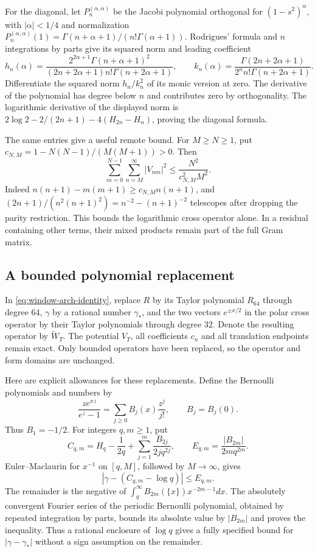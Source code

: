 \documentclass[11pt]{article}
\theoremstyle{definition}
\theoremstyle{remark}
\numberwithin{equation}{section}
\begin{document}
For the diagonal, let $P_n^{(\alpha,\alpha)}$ be the Jacobi
polynomial orthogonal for $(1-s^2)^\alpha$, with $|\alpha|<1/4$
and normalization
$P_n^{(\alpha,\alpha)}(1)=\Gamma(n+\alpha+1)/(n!\Gamma(\alpha+1))$.
Rodrigues' formula and $n$ integrations by parts give its squared
norm and leading coefficient
\[
 h_n(\alpha)=
 \frac{2^{2\alpha+1}\Gamma(n+\alpha+1)^2}
 {(2n+2\alpha+1)n!\Gamma(n+2\alpha+1)},\qquad
 k_n(\alpha)=
 \frac{\Gamma(2n+2\alpha+1)}{2^nn!\Gamma(n+2\alpha+1)}.
\]
Differentiate the squared norm $h_n/k_n^2$ of its monic version
at zero.  The derivative of the polynomial has degree below $n$
and contributes zero by orthogonality.  The logarithmic derivative
of the displayed norm is
$2\log2-2/(2n+1)-4(H_{2n}-H_n)$, proving the diagonal formula.

The same entries give a useful remote bound.  For $M\ge N\ge1$,
put $c_{N,M}=1-N(N-1)/(M(M+1))>0$.  Then
\begin{equation}
 \sum_{m=0}^{N-1}\sum_{n=M}^\infty |V_{nm}|^2
       \le\frac{N^2}{c_{N,M}^2M^2}.
 \label{eq:window-log-remote}
\end{equation}
Indeed $n(n+1)-m(m+1)\ge c_{N,M}n(n+1)$, and
$(2n+1)/(n^2(n+1)^2)=n^{-2}-(n+1)^{-2}$ telescopes after
dropping the parity restriction.  This bounds the logarithmic
cross operator alone.  In a residual containing other terms,
their mixed products remain part of the full Gram matrix.

\subsection{A bounded polynomial replacement}

In \eqref{eq:window-arch-identity}, replace $R$ by its Taylor
polynomial $R_{64}$ through degree $64$, $\gamma$ by a rational
number $\gamma_*$, and the two vectors $e^{\pm x/2}$ in the
polar cross operator by their Taylor polynomials through degree
$32$.  Denote the resulting operator by $\widetilde W_T$.
The potential $V_T$, all coefficients $c_n$ and all translation
endpoints remain exact.  Only bounded operators have been
replaced, so the operator and form domains are unchanged.

Here are explicit allowances for these replacements.  Define the
Bernoulli polynomials and numbers by
\[
 \frac{ze^{xz}}{e^z-1}=\sum_{j\ge0}B_j(x)\frac{z^j}{j!},
 \qquad B_j=B_j(0).
\]
Thus $B_1=-1/2$.  For integers $q,m\ge1$, put
\[
 C_{q,m}=H_q-\frac1{2q}
       +\sum_{j=1}^m\frac{B_{2j}}{2jq^{2j}},\qquad
 E_{q,m}=\frac{|B_{2m}|}{2mq^{2m}}.
\]
Euler--Maclaurin for $x^{-1}$ on $[q,M]$, followed by
$M\to\infty$, gives
\begin{equation}
 |\gamma-(C_{q,m}-\log q)|\le E_{q,m}.
 \label{eq:window-gamma-error}
\end{equation}
The remainder is the negative of
$\int_q^\infty B_{2m}(\{x\})x^{-2m-1}dx$.
The absolutely convergent Fourier series of the periodic Bernoulli
polynomial, obtained by repeated integration by parts, bounds its
absolute value by $|B_{2m}|$ and proves the inequality.  Thus a
rational enclosure of $\log q$ gives a fully specified bound for
$|\gamma-\gamma_*|$ without a sign assumption on the remainder.
\end{document}
